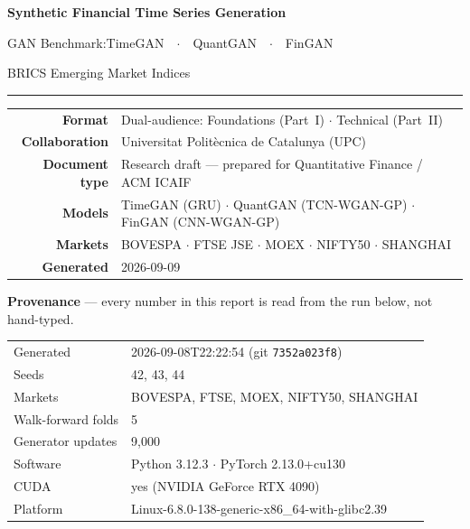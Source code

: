\documentclass[10pt]{article}
\begin{document}
\thispagestyle{empty}
\pagecolor{Navy}\color{white}

\vspace*{2.0cm}
\begin{center}
{\fontsize{26}{32}\selectfont\bfseries Synthetic Financial Time Series Generation\par}
\vspace{0.4cm}
{\Large GAN Benchmark:\quad TimeGAN\ \ $\cdot$\ \ QuantGAN\ \ $\cdot$\ \ FinGAN\par}
\vspace{0.2cm}
{\large BRICS Emerging Market Indices\par}
\vspace{0.7cm}
\textcolor{blue!40!white}{\rule{0.65\textwidth}{0.5pt}}
\vspace{0.7cm}

\begin{tabular}{r@{\hspace{10pt}}l}
  \textbf{Format}        & Dual-audience: Foundations (Part~I) $\cdot$ Technical (Part~II) \\[4pt]
  \textbf{Collaboration} & Universitat Polit\`{e}cnica de Catalunya (UPC) \\[4pt]
  \textbf{Document type} & Research draft --- prepared for Quantitative Finance / ACM ICAIF \\[4pt]
  \textbf{Models}        & TimeGAN (GRU) $\cdot$ QuantGAN (TCN-WGAN-GP) $\cdot$ FinGAN (CNN-WGAN-GP) \\[4pt]
  \textbf{Markets}       & BOVESPA $\cdot$ FTSE JSE $\cdot$ MOEX $\cdot$ NIFTY50 $\cdot$ SHANGHAI \\[4pt]
  \textbf{Generated}     & 2026-09-09 \\
\end{tabular}
\end{center}
\clearpage\pagecolor{white}\color{black}

\begin{tcolorbox}[enhanced,arc=3pt,boxrule=0.8pt,
  colframe=Navy,colback=LBg,left=8pt,right=8pt,top=5pt,bottom=5pt]
\small\textbf{Provenance} --- every number in this report is read from the run below, not hand-typed.
\begin{tabular}{@{}ll@{}}
Generated & 2026-09-08T22:22:54 (git \texttt{7352a023f8}) \\
Seeds & 42, 43, 44 \\
Markets & BOVESPA, FTSE, MOEX, NIFTY50, SHANGHAI \\
Walk-forward folds & 5 \\
Generator updates & 9,000 \\
Software & Python 3.12.3 $\cdot$ PyTorch 2.13.0+cu130 \\
CUDA & yes (NVIDIA GeForce RTX 4090) \\
Platform & Linux-6.8.0-138-generic-x86\_64-with-glibc2.39\\
\end{tabular}
\end{tcolorbox}
\end{document}
